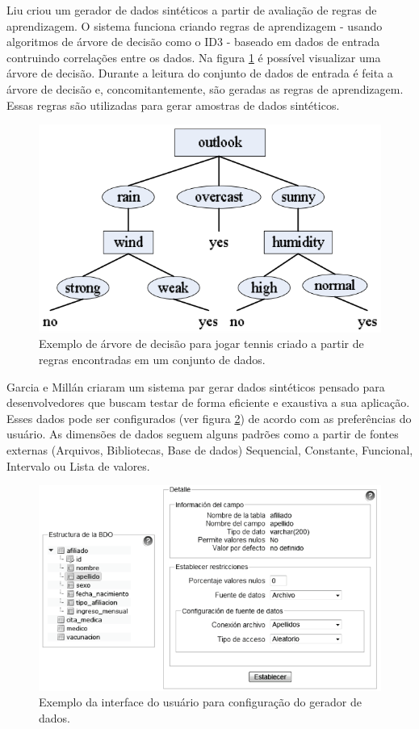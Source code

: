 \documentclass[
	12pt,				%
	openright,			%
	twoside,			%
	a4paper,			%
	english,			%
	brazil				%
	]{abntex2}
\begin{document}
		Liu \cite{Liu2016} criou um gerador de dados sintéticos a partir de avaliação de regras de aprendizagem. O sistema funciona criando regras de aprendizagem - usando algoritmos de árvore de decisão como o ID3 - baseado em dados de entrada contruindo correlações entre os dados. Na figura \ref{fig:liu} é possível visualizar uma árvore de decisão. Durante a leitura do conjunto de dados de entrada é feita a árvore de decisão e, concomitantemente, são geradas as regras de aprendizagem. Essas regras são utilizadas para gerar amostras de dados sintéticos.
		\begin{figure}[h!]
			\centering
			\includegraphics[width=\linewidth]{./figures/TrabalhosRelacionados/Liu13.png}
			\caption{Exemplo de árvore de decisão para jogar tennis criado a partir de regras encontradas em um conjunto de dados.}
			\label{fig:liu}
		\end{figure}

		Garcia e Millán \cite{Garcia2011} criaram um sistema par gerar dados sintéticos pensado para desenvolvedores que buscam testar de forma eficiente e exaustiva a sua aplicação. Esses dados pode ser configurados (ver figura \ref{fig:garcia}) de acordo com as preferências do usuário. As dimensões de dados seguem alguns padrões como a partir de fontes externas (Arquivos, Bibliotecas, Base de dados) Sequencial, Constante, Funcional, Intervalo ou Lista de valores. 
		\begin{figure}[h!]
			\centering
			\includegraphics[width=\linewidth]{./figures/TrabalhosRelacionados/Garcia18.png}
			\caption{Exemplo da interface do usuário para configuração do gerador de dados.}
			\label{fig:garcia}
		\end{figure}
\end{document}
